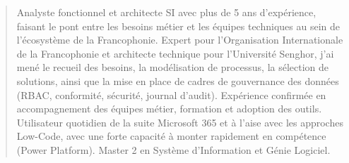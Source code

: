 \documentclass[10pt,a4paper,ragged2e,withhyper]{altacv}
\begin{document}

    
    \makecvheader

    \begin{quote}
    \normalsize Analyste fonctionnel et architecte SI avec plus de 5 ans d'expérience, faisant le pont entre les besoins métier et les équipes techniques au sein de l'écosystème de la Francophonie. Expert pour l'Organisation Internationale de la Francophonie et architecte technique pour l'Université Senghor, j'ai mené le recueil des besoins, la modélisation de processus, la sélection de solutions, ainsi que la mise en place de cadres de gouvernance des données (RBAC, conformité, sécurité, journal d'audit). Expérience confirmée en accompagnement des équipes métier, formation et adoption des outils. Utilisateur quotidien de la suite Microsoft 365 et à l'aise avec les approches Low-Code, avec une forte capacité à monter rapidement en compétence (Power Platform). Master 2 en Système d'Information et Génie Logiciel.
    \end{quote}
    \vspace{-0.5em}
\end{document}
